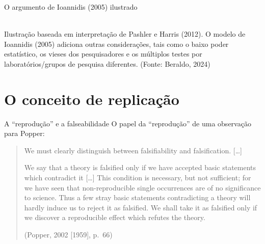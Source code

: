 \documentclass[numbering=fraction,aspectratio=169]{beamer}
\begin{document}
\begin{frame}{O argumento de Ioannidis (2005) ilustrado}

  \centering
  \\
  {\footnotesize Ilustração baseada em interpretação de Pashler e Harris (2012). O modelo de Ioannidis (2005) adiciona outras considerações, tais como o baixo poder estatístico, os vieses dos pesquisadores e os múltiplos testes por laboratórios/grupos de pesquisa diferentes. (Fonte: Beraldo, 2024)}
\end{frame}



\section{O conceito de replicação}

\begin{frame}{A “reprodução” e a falseabilidade}
  O papel da “reprodução” de uma observação para Popper:
  \medskip

  \begin{quote}
    We must clearly distinguish between \alert<1->{falsifiability and falsification}. […]

    We say that a theory is falsified only if we have accepted basic statements which contradict it […] This condition is necessary, but not sufficient; for we have seen that \alert<2->{non-reproducible single occurrences are of no significance to science}. Thus a few stray basic statements contradicting a theory will hardly induce us to reject it as falsified. \alert<3>{We shall take it as falsified only if we discover a reproducible effect which refutes the theory}.

    \raggedleft
    (Popper, 2002 [1959], p.~66)
  \end{quote}
\end{frame}
\end{document}
